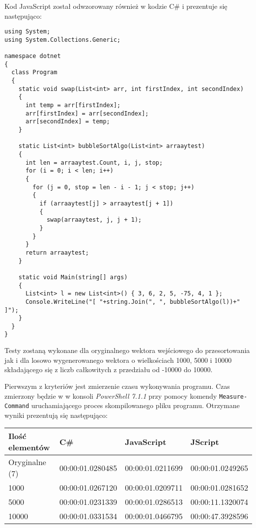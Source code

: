 \par Kod JavaScript został odwzorowany również w kodzie C\# i prezentuje się następująco:

\begin{lstlisting}[language=CSharp, caption={Odwzorowany kod JavaScript w języku C\# algorytmu sortowania bąbelkowego.}, label=alg:alg1]
using System;
using System.Collections.Generic;

namespace dotnet
{
  class Program
  {
    static void swap(List<int> arr, int firstIndex, int secondIndex)
    {
      int temp = arr[firstIndex];
      arr[firstIndex] = arr[secondIndex];
      arr[secondIndex] = temp;
    }

    static List<int> bubbleSortAlgo(List<int> arraaytest)
    {
      int len = arraaytest.Count, i, j, stop;
      for (i = 0; i < len; i++)
      {
        for (j = 0, stop = len - i - 1; j < stop; j++)
        {
          if (arraaytest[j] > arraaytest[j + 1])
          {
            swap(arraaytest, j, j + 1);
          }
        }
      }
      return arraaytest;
    }

    static void Main(string[] args)
    {
      List<int> l = new List<int>() { 3, 6, 2, 5, -75, 4, 1 };
      Console.WriteLine("[ "+string.Join(", ", bubbleSortAlgo(l))+" ]");
    }
  }
}
\end{lstlisting}

\par Testy zostaną wykonane dla oryginalnego wektora wejściowego do przesortowania jak i dla losowo wygenerowanego wektora o wielkościach 1000, 5000 i 10000 składającego się z liczb całkowitych z przedziału od -10000 do 10000.

\par Pierwszym z kryteriów jest zmierzenie czasu wykonywania programu. Czas zmierzony będzie w w konsoli \textit{PowerShell 7.1.1} przy pomocy komendy \texttt{Measure-Command} uruchamiającego proces skompilowanego pliku programu. Otrzymane wyniki prezentują się następująco:

\begin{table}[h!]
  \begin{tabular}{|l|l|l|l|}
  \hline
  Ilość elementów & C\#              & JavaScript       & JScript          \\ \hline
  Oryginalne (7)  & 00:00:01.0280485 & 00:00:01.0211699 & 00:00:01.0249265 \\ \hline
  1000            & 00:00:01.0267120 & 00:00:01.0209711 & 00:00:01.0281652 \\ \hline
  5000            & 00:00:01.0231339 & 00:00:01.0286513 & 00:00:11.1320074 \\ \hline
  10000           & 00:00:01.0331534 & 00:00:01.0466795 & 00:00:47.3928596 \\ \hline
  \end{tabular}
\end{table}

